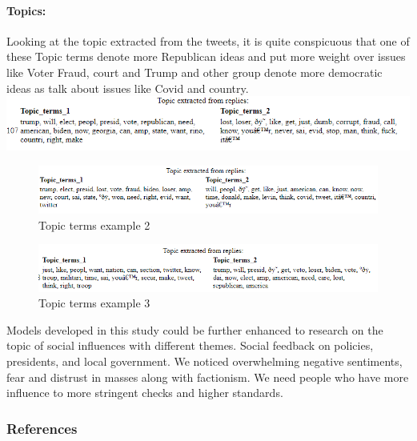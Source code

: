 \documentclass[
]{article}
\begin{document}
\hypertarget{topics}{%
\paragraph{Topics:}\label{topics}}

Looking at the topic extracted from the tweets, it is quite conspicuous
that one of these Topic terms denote more Republican ideas and put more
weight over issues like Voter Fraud, court and Trump and other group
denote more democratic ideas as talk about issues like Covid and
country. \includegraphics{final report resources/topics.png}

\begin{figure}
\centering
\includegraphics{final report resources/topics 2.png}
\caption{Topic terms example 2}
\end{figure}

\begin{figure}
\centering
\includegraphics{final report resources/topics 3.png}
\caption{Topic terms example 3}
\end{figure}

Models developed in this study could be further enhanced to research on
the topic of social influences with different themes. Social feedback on
policies, presidents, and local government. We noticed overwhelming
negative sentiments, fear and distrust in masses along with factionism.
We need people who have more influence to more stringent checks and
higher standards.

\newpage

\newpage

\hypertarget{references}{%
\subsubsection{References}\label{references}}
\end{document}
